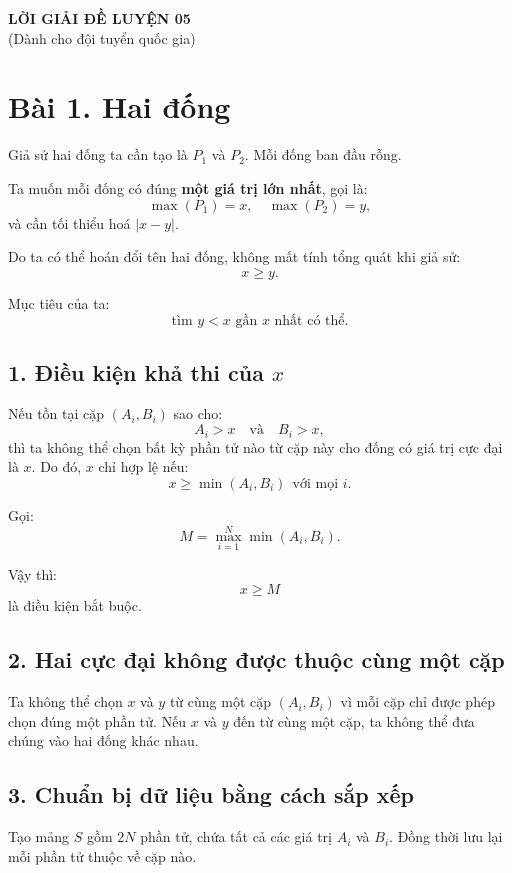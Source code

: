 \begin{center}
    {\LARGE \textbf{LỜI GIẢI ĐỀ LUYỆN 05}}\\[6pt]
    {\large (Dành cho đội tuyển quốc gia)}
\end{center}

\section*{Bài 1. Hai đống}

Giả sử hai đống ta cần tạo là $P_1$ và $P_2$. Mỗi đống ban đầu rỗng.

Ta muốn mỗi đống có đúng \textbf{một giá trị lớn nhất}, gọi là:
\[
\max(P_1) = x,\quad \max(P_2) = y,
\]
và cần tối thiểu hoá $|x - y|$.

Do ta có thể hoán đổi tên hai đống, không mất tính tổng quát khi giả sử:
\[
x \ge y.
\]

Mục tiêu của ta:  
\[
\text{tìm } y < x \text{ gần } x \text{ nhất có thể}.
\]

\subsection*{1. Điều kiện khả thi của $x$}

Nếu tồn tại cặp $(A_i, B_i)$ sao cho:
\[
A_i > x \quad \text{và} \quad B_i > x,
\]
thì ta không thể chọn bất kỳ phần tử nào từ cặp này cho đống có giá trị cực đại là $x$.  
Do đó, $x$ chỉ hợp lệ nếu:
\[
x \ge \min(A_i, B_i)\ \ \text{với mọi $i$}.
\]

Gọi:
\[
M = \max_{i=1}^N \min(A_i, B_i).
\]

Vậy thì:
\[
x \ge M
\]
là điều kiện bắt buộc.

\subsection*{2. Hai cực đại không được thuộc cùng một cặp}

Ta không thể chọn $x$ và $y$ từ cùng một cặp $(A_i, B_i)$ vì mỗi cặp chỉ được phép chọn đúng một phần tử.  
Nếu $x$ và $y$ đến từ cùng một cặp, ta không thể đưa chúng vào hai đống khác nhau.

\subsection*{3. Chuẩn bị dữ liệu bằng cách sắp xếp}

Tạo mảng $S$ gồm $2N$ phần tử, chứa tất cả các giá trị $A_i$ và $B_i$.  
Đồng thời lưu lại mỗi phần tử thuộc về cặp nào.


